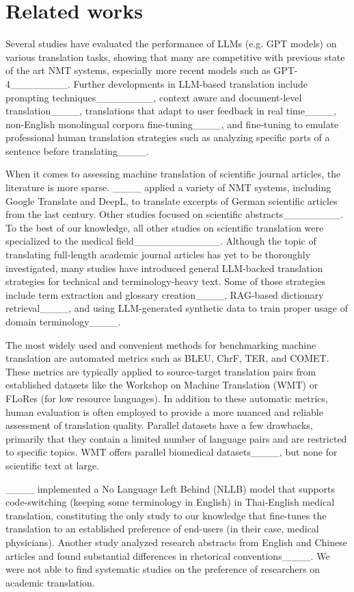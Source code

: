 \section{Related works}
Several studies have evaluated the performance of LLMs (e.g. GPT models) on various translation tasks, showing that many are competitive with previous state of the art NMT systems, especially more recent models such as GPT-4________. Further developments in LLM-based translation include prompting techniques________, context aware and document-level translation____, translations that adapt to user feedback in real time____, non-English monolingual corpora fine-tuning____, and fine-tuning to emulate professional human translation strategies such as analyzing specific parts of a sentence before translating____.

When it comes to assessing machine translation of scientific journal articles, the literature is more sparse. ____ applied a variety of NMT systems, including Google Translate and DeepL, to translate excerpts of German scientific articles from the last century. Other studies focused on scientific abstracts________. To the best of our knowledge, all other studies on scientific translation were specialized to the medical field____________. Although the topic of translating full-length academic journal articles has yet to be thoroughly investigated, many studies have introduced general LLM-backed translation strategies for technical and terminology-heavy text. Some of those strategies include term extraction and glossary creation____, RAG-based dictionary retrieval____, and using LLM-generated synthetic data to train proper usage of domain terminology____. 

The most widely used and convenient methods for benchmarking machine translation are automated metrics such as BLEU, ChrF, TER, and COMET. These metrics are typically applied to source-target translation pairs from established datasets like the Workshop on Machine Translation (WMT) or FLoRes (for low resource languages). In addition to these automatic metrics, human evaluation is often employed to provide a more nuanced and reliable assessment of translation quality. Parallel datasets have a few drawbacks, primarily that they contain a limited number of language pairs and are restricted to specific topics. WMT offers parallel biomedical datasets____, but none for scientific text at large. 

____ implemented a No Language Left Behind (NLLB) model that supports code-switching (keeping some terminology in English) in Thai-English medical translation, constituting the only study to our knowledge that fine-tunes the translation to an established preference of end-users (in their case, medical physicians). Another study analyzed research abstracts from English and Chinese articles and found substantial differences in rhetorical conventions____. We were not able to find systematic studies on the preference of researchers on academic translation.